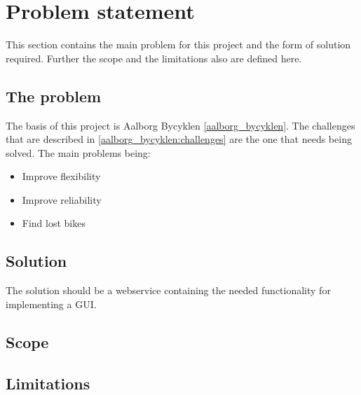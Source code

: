 \section{Problem statement}
This section contains the main problem for this project and the form of solution required.
Further the scope and the limitations also are defined here.
\subsection{The problem}
The basis of this project is Aalborg Bycyklen \cref{aalborg_bycyklen}.
The challenges that are described in \cref{aalborg_bycyklen:challenges} are the one that needs being solved.
The main problems being:
\begin{itemize}
\item Improve flexibility
\item Improve reliability
\item Find lost bikes
\end{itemize}

\subsection{Solution}
The solution should be a webservice containing the needed functionality for implementing a GUI.

\subsection{Scope}

\subsection{Limitations}